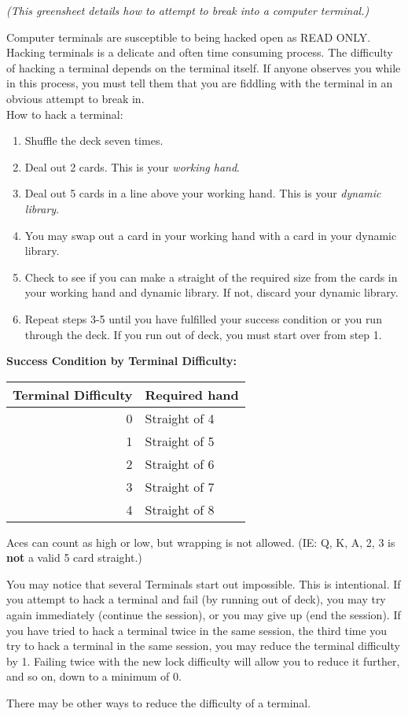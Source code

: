 \documentclass[green]{guildcamp4}
\begin{document}
\name{\gHacking{}}

\emph{(This greensheet details how to attempt to break into a computer terminal.)}

Computer terminals are susceptible to being hacked open as READ ONLY. Hacking terminals is a delicate and often time consuming process. The difficulty of hacking a terminal depends on the terminal itself. If anyone observes you while in this process, you must tell them that you are fiddling with the terminal in an obvious attempt to break in.\\

How to hack a terminal:
\begin{enumerate}
	\item Shuffle the deck seven times.
	\item Deal out 2 cards. This is your {\em working hand}.
	\item Deal out 5 cards in a line above your working hand. This is your {\em dynamic library}.
	\item You may swap out a card in your working hand with a card in your dynamic library.
	\item Check to see if you can make a straight of the required size from the cards in your working hand and dynamic library. If not, discard your dynamic library.
	\item Repeat steps 3-5 until you have fulfilled your success condition or you run through the deck.  If you run out of deck, you must start over from step 1.
\end{enumerate}

{\bf Success Condition by Terminal Difficulty:}\\

\begin{tabular}{||r|l||}
	\hline\hline
	Terminal Difficulty	& Required hand\\
	\hline
	0	& Straight of 4\\
	1	& Straight of 5\\
	2	& Straight of 6\\
	3	& Straight of 7\\
	4	& Straight of 8\\
	\hline\hline 
\end{tabular}

\vspace{10 mm}

Aces can count as high or low, but wrapping is not allowed. (IE: Q, K, A, 2, 3 is {\bf not} a valid 5 card straight.)

You may notice that several Terminals start out impossible. This is intentional. If you attempt to hack a terminal and fail (by running out of deck), you may try again immediately (continue the session), or you may give up (end the session). If you have tried to hack a terminal twice in the same session, the third time you try to hack a terminal in the same session, you may reduce the terminal difficulty by 1. Failing twice with the new lock difficulty will allow you to reduce it further, and so on, down to a minimum of 0.

There may be other ways to reduce the difficulty of a terminal.
\end{document}
